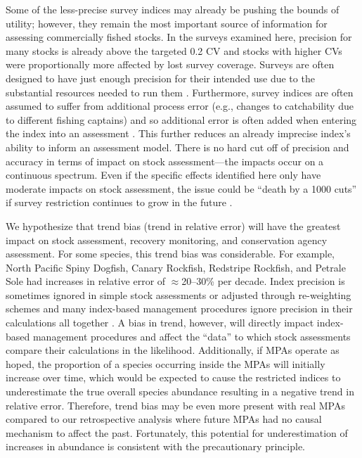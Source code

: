 \documentclass[12pt]{article}
\begin{document}
Some of the less-precise survey indices may already be pushing the bounds of utility; however, they remain the most important source of information for assessing commercially fished stocks.
In the surveys examined here, precision for many stocks is already above the targeted \citep{sinclair2003syn} 0.2 CV and stocks with higher CVs were proportionally more affected by lost survey coverage.
Surveys are often designed to have just enough precision for their intended use due to the substantial resources needed to run them \citep{hilbornwalters1992}.
Furthermore, survey indices are often assumed to suffer from additional process error (e.g., changes to catchability due to different fishing captains) and so additional error is often added when entering the index into an assessment \citep{pennington1994, francis2003}. 
This further reduces an already imprecise index's ability to inform an assessment model.
There is no hard cut off of precision and accuracy in terms of impact on stock assessment---the impacts occur on a continuous spectrum.
Even if the specific effects identified here only have moderate impacts on stock assessment, the issue could be ``death by a 1000 cuts'' if survey restriction continues to grow in the future \citep{benoit2020national}.

We hypothesize that trend bias (trend in relative error) will have the greatest impact on stock assessment, recovery monitoring, and conservation agency assessment.
For some species, this trend bias was considerable.
For example, North Pacific Spiny Dogfish, Canary Rockfish, Redstripe Rockfish, and Petrale Sole had increases in relative error of $\approx$20--30\% per decade.
Index precision is sometimes ignored in simple stock assessments \citep{free2020} or adjusted through re-weighting schemes \citep{francis2011} and many index-based management procedures ignore precision in their calculations all together \citep{carruthers2016}.
A bias in trend, however, will directly impact index-based management procedures and affect the ``data'' to which stock assessments compare their calculations in the likelihood.
Additionally, if MPAs operate as hoped, the proportion of a species occurring inside the MPAs will initially increase over time, which would be expected to cause the restricted indices to underestimate the true overall species abundance resulting in a negative trend in relative error.
Therefore, trend bias may be even more present with real MPAs compared to our retrospective analysis where future MPAs had no causal mechanism to affect the past.
Fortunately, this potential for underestimation of increases in abundance is consistent with the precautionary principle.
\end{document}

